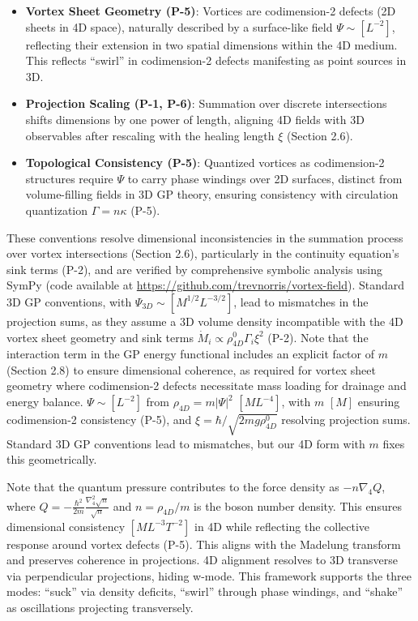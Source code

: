 \begin{itemize}
    \item \textbf{Vortex Sheet Geometry (P-5)}: Vortices are codimension-2 defects (2D sheets in 4D space), naturally described by a surface-like field $\Psi \sim [L^{-2}]$, reflecting their extension in two spatial dimensions within the 4D medium. This reflects ``swirl'' in codimension-2 defects manifesting as point sources in 3D.
    \item \textbf{Projection Scaling (P-1, P-6)}: Summation over discrete intersections shifts dimensions by one power of length, aligning 4D fields with 3D observables after rescaling with the healing length $\xi$ (Section 2.6).
    \item \textbf{Topological Consistency (P-5)}: Quantized vortices as codimension-2 structures require $\Psi$ to carry phase windings over 2D surfaces, distinct from volume-filling fields in 3D GP theory, ensuring consistency with circulation quantization $\Gamma = n \kappa$ (P-5).
\end{itemize}

These conventions resolve dimensional inconsistencies in the summation process over vortex intersections (Section 2.6), particularly in the continuity equation's sink terms (P-2), and are verified by comprehensive symbolic analysis using SymPy (code available at \url{https://github.com/trevnorris/vortex-field}). Standard 3D GP conventions, with $\Psi_{3D} \sim [M^{1/2} L^{-3/2}]$, lead to mismatches in the projection sums, as they assume a 3D volume density incompatible with the 4D vortex sheet geometry and sink terms $\dot{M}_i \propto \rho_{4D}^0 \Gamma_i \xi^2$ (P-2). Note that the interaction term in the GP energy functional includes an explicit factor of $m$ (Section 2.8) to ensure dimensional coherence, as required for vortex sheet geometry where codimension-2 defects necessitate mass loading for drainage and energy balance. $\Psi \sim [L^{-2}]$ from $\rho_{4D} = m |\Psi|^2$ $[M L^{-4}]$, with $m$ $[M]$ ensuring codimension-2 consistency (P-5), and $\xi = \hbar / \sqrt{2 m g \rho_{4D}^0}$ resolving projection sums. Standard 3D GP conventions lead to mismatches, but our 4D form with $m$ fixes this geometrically.

Note that the quantum pressure contributes to the force density as $-n \nabla_4 Q$, where $Q = -\frac{\hbar^2}{2m} \frac{\nabla_4^2 \sqrt{n}}{\sqrt{n}}$ and $n = \rho_{4D}/m$ is the boson number density. This ensures dimensional consistency $[M L^{-3} T^{-2}]$ in 4D while reflecting the collective response around vortex defects (P-5). This aligns with the Madelung transform and preserves coherence in projections. 4D alignment resolves to 3D transverse via perpendicular projections, hiding w-mode. This framework supports the three modes: ``suck'' via density deficits, ``swirl'' through phase windings, and ``shake'' as oscillations projecting transversely.

